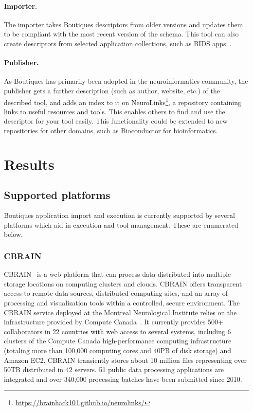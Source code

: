 \documentclass{article}
\newcommand{\boutiques}{Boutiques\xspace}
\begin{document}
\paragraph{Importer.} The importer takes \boutiques descriptors from older versions and
updates them to be compliant with the most recent version of the schema. This tool can
also create descriptors from selected application collections, such as BIDS
apps~\cite{gorgolewski2017bids}.

\paragraph{Publisher.} As \boutiques has primarily been adopted in the neuroinformatics
community, the publisher gets a further description (such as author, website, etc.) of
the described tool, and adds an index to it on
NeuroLinks\footnote{\url{https://brainhack101.github.io/neurolinks/}}, a repository
containing links to useful resources and tools. This enables others to find and use the
descriptor for your tool easily. This functionality could be extended to
new repositories for other domains, such as Bioconductor for bioinformatics.

\section{Results}
\label{sec:results}

\subsection{Supported platforms}

\boutiques application import and execution is currently supported by several
platforms which aid in execution and tool management. These are enumerated
below.

\subsubsection{CBRAIN}

CBRAIN~\cite{SHER-14} is a web platform that can process data
distributed into multiple storage locations on computing clusters and
clouds. CBRAIN offers transparent access to remote data sources,
distributed computing sites, and an array of processing and
visualization tools within a controlled, secure environment.  The
CBRAIN service deployed at the Montreal Neurological Institute relies
on the infrastructure provided by Compute Canada~\cite{das2016mni}. It
currently provides 500+ collaborators in 22 countries with web access
to several systems, including 6 clusters of the Compute Canada
high-performance computing infrastructure (totaling more than 100,000
computing cores and 40PB of disk storage) and Amazon EC2. CBRAIN
transiently stores about 10 million files representing over 50TB
distributed in 42 servers. 51 public data processing applications are
integrated and over 340,000 processing batches have been submitted since 2010.
\end{document}
